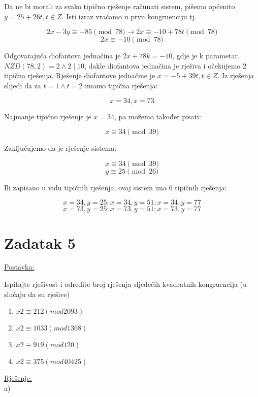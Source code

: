 \documentclass[12pt]{article}
\begin{document}
Da ne bi morali za svako tipično rješenje računati sistem, pišemo općenito $y = 25 + 26t, t \in Z$. Isti izraz vraćamo u prvu kongruenciju tj.

$$2x - 3y \equiv -85 \pmod{78} \to 2x \equiv -10 + 78t \pmod{78}$$
$$2x \equiv -10 \pmod{78}$$\vspace{1mm}

Odgovarajuća diofantova jednačina je $2x + 78k = -10$, gdje je k parametar. $NZD(78, 2) = 2 \land 2 \mid 10$, dakle diofantova jednačina je rješiva i očekujemo 2 tipična rješenja. Rješenje diofantove jednačine je $x = -5 + 39t, t \in Z$. Iz rješenja slijedi da za $t = 1 \land t = 2$ imamo tipična rješenja:

$$x = 34, x = 73$$\vspace{1mm}

Najmanje tipično rješenje je $x = 34$, pa možemo također pisati:

$$x \equiv 34 \pmod{39}$$\vspace{1mm}

Zaključujemo da je rješenje sistema:

$$x \equiv 34 \pmod{39}$$
$$y \equiv 25 \pmod{26}$$\vspace{1mm}

Ili zapisano u vidu tipičnih rješenja; ovaj sistem ima 6 tipičnih rješenja:

$$x = 34, y = 25; x = 34, y = 51; x = 34, y = 77$$
$$x = 73, y = 25; x = 73, y = 51; x = 73, y = 77$$

\newpage

\section*{Zadatak 5\label{Z5} }

\underline{Postavka:}

Ispitajte rješivost i odredite broj rješenja sljedećih kvadratnih kongruencija (u slučaju da su rješive)

\begin{enumerate}
\item $x2 \equiv 212 (mod 2093)$
\item $x2 \equiv 1033 (mod 1368)$
\item $x2 \equiv 919 (mod 120)$
\item $x2 \equiv 375 (mod 40425)$
\end{enumerate}

\underline{Rješenje:}\\

\hspace{6.8mm}a)
\end{document}
